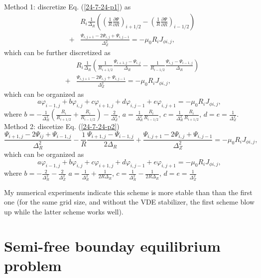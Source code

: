\documentclass{llncs}
\newcommand{\tmsamp}[1]{\textsf{#1}}
\begin{document}
Method 1: discretize Eq. (\ref{24-7-24-p1}) as
\begin{eqnarray}
  &  & R_i \frac{1}{\Delta_R} \left( \left( \frac{1}{R} \frac{\partial
  \Psi}{\partial R} \right)_{i + 1 / 2} - \left( \frac{1}{R} \frac{\partial
  \Psi}{\partial R} \right)_{i - 1 / 2} \right) \nonumber\\
  & + & \frac{\Psi_{i, j + 1} - 2 \Psi_{i, j} + \Psi_{i, j - 1}}{\Delta_Z^2}
  = - \mu_0 R_i J_{\phi i, j}, 
\end{eqnarray}
which can be further discretized as
\begin{eqnarray}
  &  & R_i \frac{1}{\Delta_R} \left( \frac{1}{R_{i + 1 / 2}}  \frac{\Psi_{i +
  1, j} - \Psi_{i, j}}{\Delta_R} - \frac{1}{R_{i - 1 / 2}}  \frac{\Psi_{i, j}
  - \Psi_{i - 1, j}}{\Delta_R} \right) \nonumber\\
  & + & \frac{\Psi_{i, j + 1} - 2 \Psi_{i, j} + \Psi_{i, j - 1}}{\Delta_Z^2}
  = - \mu_0 R_i J_{\phi i, j}, 
\end{eqnarray}
which can be organized as
\[ a \varphi_{i - 1, j} + b \varphi_{i, j} + c \varphi_{i + 1, j} + d
   \varphi_{i, j - 1} + e \varphi_{i, j + 1} = - \mu_0 R_i J_{\phi i, j}, \]
where $b = - \frac{1}{\Delta_R^2}  \left( \frac{R_i}{R_{i + 1 / 2}} +
\frac{R_i}{R_{i - 1 / 2}} \right) - \frac{2}{\Delta_Z^2}$, $a =
\frac{1}{\Delta_R^2} \frac{R_i}{R_{i - 1 / 2}}$, $c = \frac{1}{\Delta_R^2}
\frac{R_i}{R_{i + 1 / 2}}$, $d = e = \frac{1}{\Delta_Z^2}$. Method 2:
discetize Eq. (\ref{24-7-24-p2})
\[ \frac{\Psi_{i + 1, j} - 2 \Psi_{i j} + \Psi_{i - 1, j}}{\Delta_R^2} -
   \frac{1}{R} \frac{\Psi_{i + 1, j} - \Psi_{i - 1, j}}{2 \Delta_R} +
   \frac{\Psi_{i, j + 1} - 2 \Psi_{i, j} + \Psi_{i, j - 1}}{\Delta_Z^2} = -
   \mu_0 R_i J_{\phi i, j}, \]
which can be organized as
\[ a \varphi_{i - 1, j} + b \varphi_{i, j} + c \varphi_{i + 1, j} + d
   \varphi_{i, j - 1} + e \varphi_{i, j + 1} = - \mu_0 R_i J_{\phi i, j}, \]
where $b = - \frac{2}{\Delta_R^2} - \frac{2}{\Delta_Z^2}$ $a =
\frac{1}{\Delta_R^2} + \frac{1}{2 R \Delta_R}$, $c = \frac{1}{\Delta_R^2} -
\frac{1}{2 R \Delta_R}$, $d = e = \frac{1}{\Delta_Z^2}$

My numerical experiments indicate{\tmsamp{}} this scheme is more stable than
than the first one (for the same grid size, and without the VDE stabilizer,
the first scheme blow up while the latter scheme works well).

\section{Semi-free bounday equilibrium problem}
\end{document}
